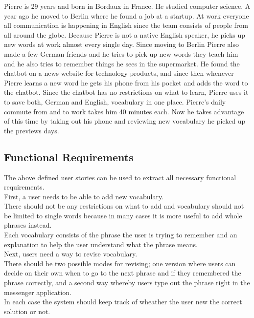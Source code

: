 Pierre is 29 years and born in Bordaux in France.
He studied computer science.
A year ago he moved to Berlin where he found a job at a startup.
At work everyone all communication is happening in English since the team consists of people from all around the globe.
Because Pierre is not a native English speaker, he picks up new words at work almost every single day.
Since moving to Berlin Pierre also made a few German friends and he tries to pick up new words they teach him
and he also tries to remember things he sees in the supermarket.
He found the chatbot on a news website for technology products,
and since then whenever Pierre learns a new word he gets his phone from his pocket and adds the word to the chatbot.
Since the chatbot has no restrictions on what to learn, Pierre uses it to save both, German and English, vocabulary in one place.
Pierre's daily commute from and to work takes him 40 minutes each.
Now he takes advantage of this time by taking out his phone and reviewing new vocabulary he picked up the previews days.
\\


\subsection{Functional Requirements}

The above defined user stories can be used to extract all necessary functional requirements.
\\

First, a user needs to be able to add new vocabulary.
\\
There should not be any restrictions on what to add
and vocabulary should not be limited to single words because in many cases it is more useful
to add whole phrases instead.
\\
Each vocabulary consists of the phrase the user is trying to remember
and an explanation to help the user understand what the phrase means.
\\

Next, users need a way to revise vocabulary.
\\
There should be two possible modes for revising;
one version where users can decide on their own when to go to the next phrase
and if they remembered the phrase correctly,
and a second way whereby users type out the phrase right in the messenger application.
\\
In each case the system should keep track of wheather the user new the correct solution or not.
\\

